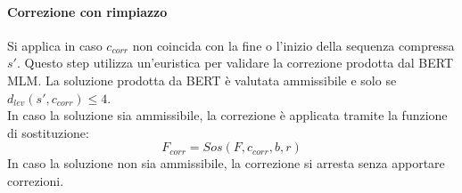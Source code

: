 \paragraph{Correzione con rimpiazzo}
Si applica in caso $c_{corr}$ non coincida con la fine o l'inizio della sequenza compressa $s\prime$. Questo step utilizza un'euristica per validare la correzione prodotta dal BERT MLM. La soluzione prodotta da BERT è valutata ammissibile e solo se $d_{lev}(s\prime,c_{corr}) \leqslant 4$.\\
In caso la soluzione sia ammissibile, la correzione è applicata tramite la funzione di sostituzione:
\begin{equation}
F_{corr} = \textit{Sos}(F,c_{corr},b,r)
\end{equation}
In caso la soluzione non sia ammissibile, la correzione si arresta senza apportare correzioni.


















